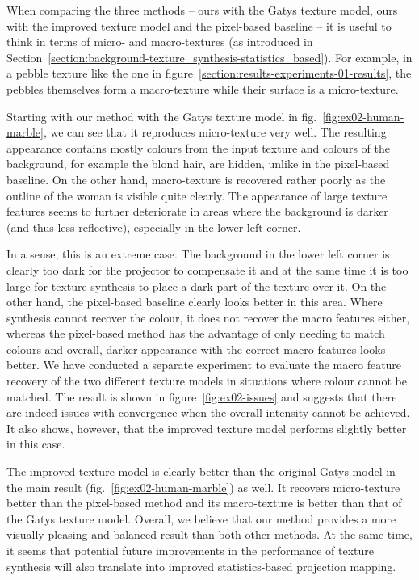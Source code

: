 When comparing the three methods -- ours with the Gatys texture model, ours with the improved texture model and the pixel-based baseline -- it is useful to think in terms of micro- and macro-textures (as introduced in Section~\ref{section:background-texture_synthesis-statistics_based}). For example, in a pebble texture like the one in figure~\ref{section:results-experiments-01-results}, the pebbles themselves form a macro-texture while their surface is a micro-texture.

Starting with our method with the Gatys texture model in fig.~\ref{fig:ex02-human-marble}, we can see that it reproduces micro-texture very well. The resulting appearance contains mostly colours from the input texture and colours of the background, for example the blond hair, are hidden, unlike in the pixel-based baseline. On the other hand, macro-texture is recovered rather poorly as the outline of the woman is visible quite clearly. The appearance of large texture features seems to further deteriorate in areas where the background is darker (and thus less reflective), especially in the lower left corner.

In a sense, this is an extreme case. The background in the lower left corner is clearly too dark for the projector to compensate it and at the same time it is too large for texture synthesis to place a dark part of the texture over it. On the other hand, the pixel-based baseline clearly looks better in this area. Where synthesis cannot recover the colour, it does not recover the macro features either, whereas the pixel-based method has the advantage of only needing to match colours and overall, darker appearance with the correct macro features looks better. We have conducted a separate experiment to evaluate the macro feature recovery of the two different texture models in situations where colour cannot be matched. The result is shown in figure~\ref{fig:ex02-issues} and suggests that there are indeed issues with convergence when the overall intensity cannot be achieved. It also shows, however, that the improved texture model performs slightly better in this case.

The improved texture model is clearly better than the original Gatys model in the main result (fig.~\ref{fig:ex02-human-marble}) as well. It recovers micro-texture better than the pixel-based method and its macro-texture is better than that of the Gatys texture model. Overall, we believe that our method provides a more visually pleasing and balanced result than both other methods. At the same time, it seems that potential future improvements in the performance of texture synthesis will also translate into improved statistics-based projection mapping.

